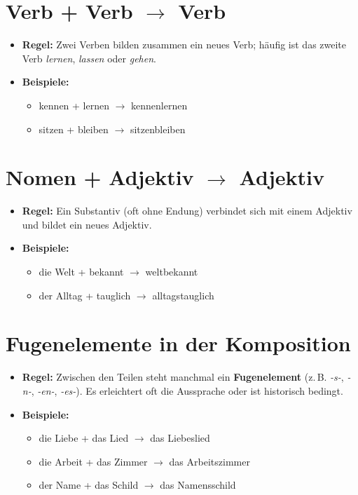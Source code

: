 \documentclass[a4paper]{article}
\begin{document}
    
    \section{Verb + Verb \texorpdfstring{$\rightarrow$}{->} Verb}
        \begin{itemize}
            \item \textbf{Regel:} Zwei Verben bilden zusammen ein neues Verb; häufig ist das zweite Verb \textit{lernen}, \textit{lassen} oder \textit{gehen}.
            \item \textbf{Beispiele:}
            \begin{itemize}
                \item kennen + lernen $\rightarrow$ kennenlernen
                \item sitzen + bleiben $\rightarrow$ sitzenbleiben
            \end{itemize}
        \end{itemize}
    
    
    \section{Nomen + Adjektiv \texorpdfstring{$\rightarrow$}{->} Adjektiv}
        \begin{itemize}
            \item \textbf{Regel:} Ein Substantiv (oft ohne Endung) verbindet sich mit einem Adjektiv und bildet ein neues Adjektiv.
            \item \textbf{Beispiele:}
            \begin{itemize}
                \item die Welt + bekannt $\rightarrow$ weltbekannt
                \item der Alltag + tauglich $\rightarrow$ alltagstauglich
            \end{itemize}
        \end{itemize}
    
    
    \section{Fugenelemente in der Komposition}
        \begin{itemize}
            \item \textbf{Regel:} Zwischen den Teilen steht manchmal ein \textbf{Fugenelement} (z.\,B. \textit{-s-}, \textit{-n-}, \textit{-en-}, \textit{-es-}). Es erleichtert oft die Aussprache oder ist historisch bedingt.
            \item \textbf{Beispiele:}
            \begin{itemize}
                \item die Liebe + das Lied $\rightarrow$ das Liebeslied
                \item die Arbeit + das Zimmer $\rightarrow$ das Arbeitszimmer
                \item der Name + das Schild $\rightarrow$ das Namensschild
            \end{itemize}
        \end{itemize}
\end{document}
